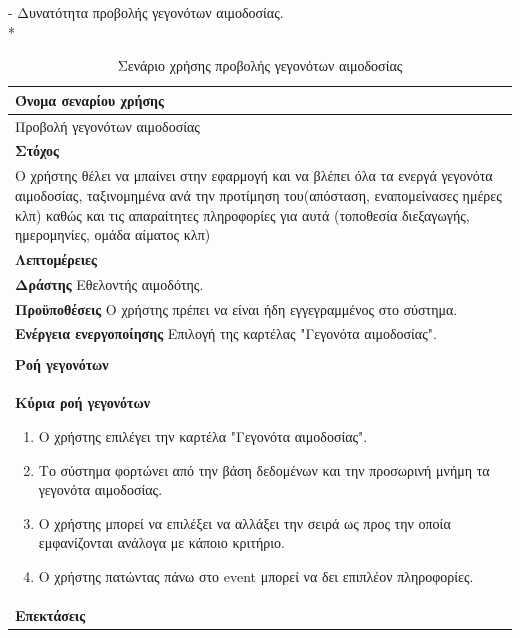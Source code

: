 -	Δυνατότητα προβολής γεγονότων αιμοδοσίας.
\\*
\begin{table}[H]	
	\begin{center}
	    \begin{tabular}{|p{\dimexpr \linewidth-2\tabcolsep}|}
	    \hline
	    \rowcolor{grayy}
	    \textbf{Όνομα σεναρίου χρήσης}
	    \\ \hline    
	    Προβολή γεγονότων αιμοδοσίας
	     \\ \hline
	    \rowcolor{grayy}
	    \textbf{\textbf{Στόχος}}
	    \\ \hline
	 	Ο χρήστης θέλει να μπαίνει στην εφαρμογή και να βλέπει όλα τα ενεργά γεγονότα αιμοδοσίας, ταξινομημένα ανά την προτίμηση του(απόσταση, εναπομείνασες ημέρες κλπ) καθώς και τις απαραίτητες πληροφορίες για αυτά (τοποθεσία διεξαγωγής, ημερομηνίες, ομάδα αίματος κλπ)
	    \\ \hline
	    \rowcolor{grayy}
	    \textbf{Λεπτομέρειες}
	    \\ \hline
		\textbf{Δράστης} Εθελοντής αιμοδότης.
		\\*
		\textbf{Προϋποθέσεις} Ο χρήστης πρέπει να είναι ήδη εγγεγραμμένος στο σύστημα.
		\\*
		\textbf{Ενέργεια ενεργοποίησης} Επιλογή της καρτέλας "Γεγονότα αιμοδοσίας".
		\\ \hline
	    \\ \hline
		\rowcolor{grayy}    
	    \textbf{Ροή γεγονότων}
	    \\* 
		\textbf{Κύρια ροή γεγονότων}
		\begin{enumerate}
			\item	Ο χρήστης επιλέγει την καρτέλα "Γεγονότα αιμοδοσίας".
			\item Το σύστημα φορτώνει από την βάση δεδομένων και την προσωρινή μνήμη τα γεγονότα αιμοδοσίας.
			\item Ο χρήστης μπορεί να επιλέξει να αλλάξει την σειρά ως προς την οποία εμφανίζονται ανάλογα με κάποιο κριτήριο.
			\item Ο χρήστης πατώντας πάνω στο event μπορεί να δει επιπλέον πληροφορίες.
		\end{enumerate}
		\\*
		\textbf{Επεκτάσεις}
		   \\ \hline
	    \end{tabular}
	    \caption{Σενάριο χρήσης προβολής γεγονότων αιμοδοσίας}
	    \label{tab:blood_donation_events_show} 
	\end{center}
\end{table}

